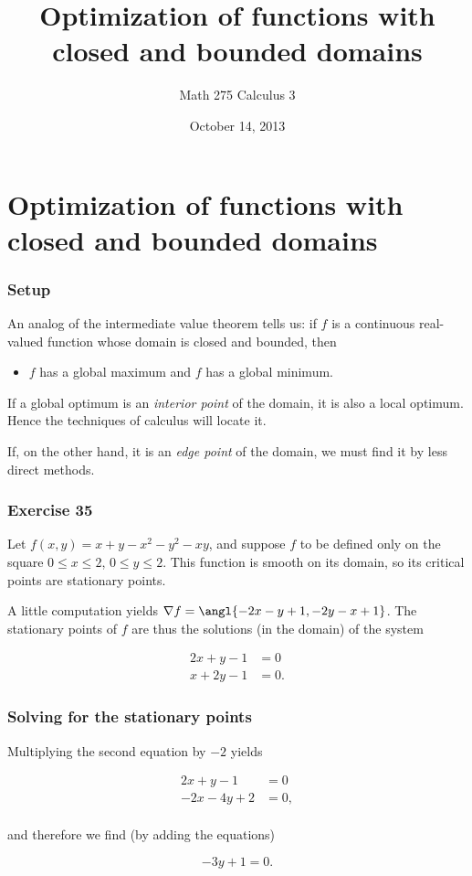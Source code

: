 \documentclass[%
  11pt,%
  ignorenonframetext,%
  xcolor={svgnames},%
  aspectratio=169%
]{beamer}
\title{Optimization of functions with closed and bounded domains}
\author{Math 275 Calculus 3}
\date{October 14, 2013}
\begin{document}
\frame{\titlepage}

\section{Optimization of functions with closed and bounded domains}

\begin{frame}\frametitle{Setup}

An analog of the intermediate value theorem tells us: if $f$ is a
continuous real-valued function whose domain is closed and bounded, then

\begin{itemize}

\item
  $f$ has a global maximum and $f$ has a global minimum.
\end{itemize}

If a global optimum is an \emph{interior point} of the domain, it is
also a local optimum. Hence the techniques of calculus will locate it.

If, on the other hand, it is an \emph{edge point} of the domain, we must
find it by less direct methods.

\end{frame}

\begin{frame}\frametitle{Exercise 35}

Let $f(x,y) = x + y - x^2 - y^2 - xy$, and suppose $f$ to be defined
only on the square $0 \leq x \leq 2$, $0 \leq y \leq 2$. This function
is smooth on its domain, so its critical points are stationary points.

A little computation yields
$\nabla f = \angl{-2x - y + 1, -2y - x + 1}$. The stationary points of
$f$ are thus the solutions (in the domain) of the system

\begin{align*}
    2x + y - 1 &= 0 \\
    x + 2y - 1 &= 0.
\end{align*}

\end{frame}

\begin{frame}\frametitle{Solving for the stationary points}

Multiplying the second equation by $-2$ yields

\begin{align*}
    2x + y - 1 &= 0 \\
    -2x - 4y + 2 &= 0, \\
\end{align*}

and therefore we find (by adding the equations)

\begin{equation*}
    -3y + 1 = 0.
\end{equation*}

\end{frame}
\end{document}
